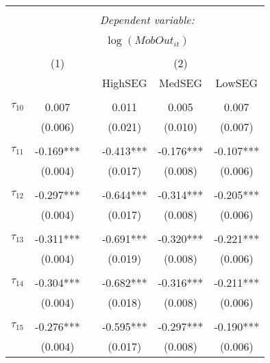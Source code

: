\begin{tabular}{@{\extracolsep{-5pt}}lccccc} 
\\[-1.8ex]\hline 
\hline \\[-1.8ex] 
 & \multicolumn{5}{c}{\textit{Dependent variable:}} \\ 
\cline{2-6} 
\\[-1.8ex] & \multicolumn{5}{c}{$\log(MobOut_{it})$}\\ 
\\[-1.8ex] & (1) && \multicolumn{3}{c}{(2)} \\ 
\cline{2-2}\cline{4-6}
        &&& HighSEG & MedSEG & LowSEG  \\
 \\[-1.8ex] 
$\tau_{10}$     &   0.007   &&   0.011   &   0.005   &   0.007   \\
                &  (0.006)  &&  (0.021)  &  (0.010)  &  (0.007)  \\
                &           &&           &           &           \\[-2.1ex]
$\tau_{11}$     & -0.169*** && -0.413*** & -0.176*** & -0.107*** \\
                &  (0.004)  &&  (0.017)  &  (0.008)  &  (0.006)  \\
                &           &&           &           &           \\[-2.1ex]
$\tau_{12}$     & -0.297*** && -0.644*** & -0.314*** & -0.205*** \\
                &  (0.004)  &&  (0.017)  &  (0.008)  &  (0.006)  \\
                &           &&           &           &           \\[-2.1ex]
$\tau_{13}$     & -0.311*** && -0.691*** & -0.320*** & -0.221*** \\
                &  (0.004)  &&  (0.019)  &  (0.008)  &  (0.006)  \\
                &           &&           &           &           \\[-2.1ex]
$\tau_{14}$     & -0.304*** && -0.682*** & -0.316*** & -0.211*** \\
                &  (0.004)  &&  (0.018)  &  (0.008)  &  (0.006)  \\
                &           &&           &           &           \\[-2.1ex]
$\tau_{15}$     & -0.276*** && -0.595*** & -0.297*** & -0.190*** \\
                &  (0.004)  &&  (0.017)  &  (0.008)  &  (0.006)  \\

\end{tabular}
